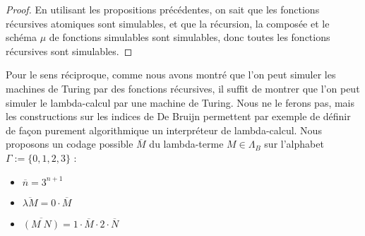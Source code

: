 \begin{proof}
    En utilisant les propositions précédentes, on sait que les fonctions récursives atomiques sont simulables, et que la récursion, la composée et le schéma $\mu$ de fonctions simulables sont simulables, donc toutes les fonctions récursives sont simulables.
\end{proof}

Pour le sens réciproque, comme nous avons montré que l'on peut simuler les machines de Turing par des fonctions récursives, il suffit de montrer que l'on peut simuler le lambda-calcul par une machine de Turing. Nous ne le ferons pas, mais les constructions sur les indices de De Bruijn permettent par exemple de définir de façon purement algorithmique un interpréteur de lambda-calcul. Nous proposons un codage possible $\overline M$ du lambda-terme $M\in\Lambda_B$ sur l'alphabet $\Gamma := \{0,1,2,3\}$ :
\begin{itemize}[label=$\bullet$]
    \item $\overline n = 3^{n+1}$
    \item $\overline{\lambda M} = 0\cdot \overline M$
    \item $\overline{(M\;N)} = 1\cdot\overline M\cdot2\cdot\overline N$
\end{itemize}